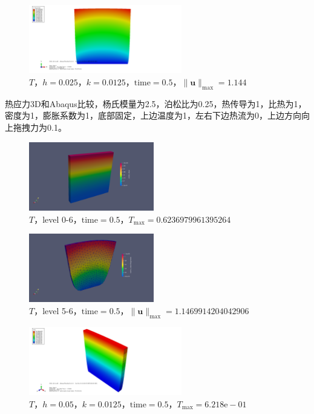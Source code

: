 \begin{figure}[!htbp]
  \centering
  \includegraphics[height=3cm]{fig/4/3.10.5:4.png}
  \caption{$T$，$h=0.025$，$k=0.0125$，$\mathrm{time}=0.5$，$\|\mathbf u\|_{\max}=1.144$}
  \label{fig:4.1.4:4}
\end{figure}

热应力3D和Abaqus比较，杨氏模量为2.5，泊松比为0.25，热传导为1，比热为1，密度为1，膨胀系数为1，底部固定，上边温度为1，左右下边热流为0，上边方向向上拖拽力为0.1。  

\begin{figure}[!htbp]
  \centering
  \includegraphics[height=3cm]{fig/4/3.10.5:5.png}
  \caption{$T$，level 0-6，$\mathrm{time}=0.5$，$T_{\max}=0.6236979961395264$}
  \label{fig:4.1.4:4}
\end{figure}

\begin{figure}[!htbp]
  \centering
  \includegraphics[height=3cm]{fig/4/3.10.5:6.png}
  \caption{$T$，level 5-6，$\mathrm{time}=0.5$，$\|\mathbf u\|_{\max}=1.1469914204042906$}
  \label{fig:4.1.4:4}
\end{figure}

\begin{figure}[!htbp]
  \centering
  \includegraphics[height=3cm]{fig/4/3.10.5:7.png}
  \caption{$T$，$h=0.05$，$k=0.0125$，$\mathrm{time}=0.5$，$T_{\max}=6.218\mathrm e-01$}
  \label{fig:4.1.4:4}
\end{figure}

